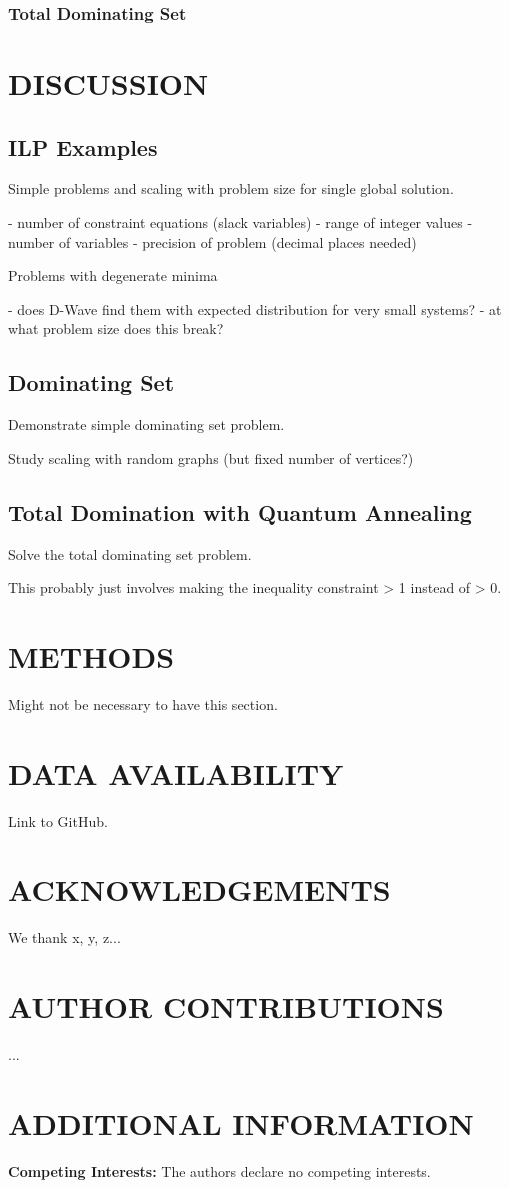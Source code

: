 \documentclass[fleqn,10pt]{wlscirep}
\begin{document}
\subsubsection{Total Dominating Set}

\section{DISCUSSION}

\subsection{ILP Examples}

Simple problems and scaling with problem size for single global solution.

- number of constraint equations (slack variables)
- range of integer values
- number of variables
- precision of problem (decimal places needed)

Problems with degenerate minima

- does D-Wave find them with expected distribution for very small systems?
- at what problem size does this break?

\subsection{Dominating Set}

Demonstrate simple dominating set problem.

Study scaling with random graphs (but fixed number of vertices?)

\subsection{Total Domination with Quantum Annealing}

Solve the total dominating set problem.

This probably just involves making the inequality constraint > 1 instead of > 0.

\section{METHODS}

Might not be necessary to have this section.


\section{DATA AVAILABILITY}
	
Link to GitHub.

\section{ACKNOWLEDGEMENTS}

We thank x, y, z...

\section{AUTHOR CONTRIBUTIONS}

...

\section{ADDITIONAL INFORMATION}

\textbf{Competing Interests:} The authors declare no competing interests.


\end{document}

